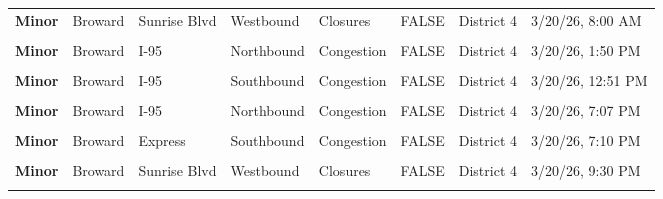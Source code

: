 \documentclass[
]{article}
\begin{document}
\begin{longtable}[t]{>{\raggedright\arraybackslash}p{1.5cm}>{\raggedright\arraybackslash}p{2.5cm}>{\raggedright\arraybackslash}p{3cm}>{\raggedright\arraybackslash}p{1.8cm}>{\raggedright\arraybackslash}p{2.5cm}lll}
\textbf{Minor} & Broward & Sunrise Blvd & Westbound & Closures & FALSE & District 4 & 3/20/26, 8:00 AM\\
\textbf{\cellcolor{gray!10}{Minor}} & \cellcolor{gray!10}{Broward} & \cellcolor{gray!10}{Floridas Turnpike} & \cellcolor{gray!10}{Southbound} & \cellcolor{gray!10}{Incidents} & \cellcolor{gray!10}{FALSE} & \cellcolor{gray!10}{District 4} & \cellcolor{gray!10}{3/20/26, 9:37 AM}\\
\addlinespace
\textbf{Minor} & Broward & I-95 & Northbound & Congestion & FALSE & District 4 & 3/20/26, 1:50 PM\\
\textbf{\cellcolor{gray!10}{Minor}} & \cellcolor{gray!10}{Broward} & \cellcolor{gray!10}{95 Express} & \cellcolor{gray!10}{Northbound} & \cellcolor{gray!10}{Congestion} & \cellcolor{gray!10}{FALSE} & \cellcolor{gray!10}{District 4} & \cellcolor{gray!10}{3/20/26, 1:50 PM}\\
\textbf{Minor} & Broward & I-95 & Southbound & Congestion & FALSE & District 4 & 3/20/26, 12:51 PM\\
\textbf{\cellcolor{gray!10}{Minor}} & \cellcolor{gray!10}{Broward} & \cellcolor{gray!10}{I-95} & \cellcolor{gray!10}{Southbound} & \cellcolor{gray!10}{Congestion} & \cellcolor{gray!10}{FALSE} & \cellcolor{gray!10}{District 4} & \cellcolor{gray!10}{3/20/26, 7:05 PM}\\
\textbf{Minor} & Broward & I-95 & Northbound & Congestion & FALSE & District 4 & 3/20/26, 7:07 PM\\
\addlinespace
\textbf{\cellcolor{gray!10}{Minor}} & \cellcolor{gray!10}{Broward} & \cellcolor{gray!10}{95 Express} & \cellcolor{gray!10}{Northbound} & \cellcolor{gray!10}{Congestion} & \cellcolor{gray!10}{FALSE} & \cellcolor{gray!10}{District 4} & \cellcolor{gray!10}{3/20/26, 6:57 PM}\\
\textbf{Minor} & Broward & 95 Express & Southbound & Congestion & FALSE & District 4 & 3/20/26, 7:10 PM\\
\textbf{\cellcolor{gray!10}{Minor}} & \cellcolor{gray!10}{Broward} & \cellcolor{gray!10}{Sunrise Blvd} & \cellcolor{gray!10}{Eastbound} & \cellcolor{gray!10}{Closures} & \cellcolor{gray!10}{FALSE} & \cellcolor{gray!10}{District 4} & \cellcolor{gray!10}{3/20/26, 9:30 PM}\\
\textbf{Minor} & Broward & Sunrise Blvd & Westbound & Closures & FALSE & District 4 & 3/20/26, 9:30 PM\\
\textbf{\cellcolor{gray!10}{Minor}} & \cellcolor{gray!10}{Broward} & \cellcolor{gray!10}{Floridas Turnpike} & \cellcolor{gray!10}{Southbound} & \cellcolor{gray!10}{Disabled Vehicles} & \cellcolor{gray!10}{FALSE} & \cellcolor{gray!10}{District 4} & \cellcolor{gray!10}{3/20/26, 9:32 PM}\\

\end{longtable}
\end{document}
